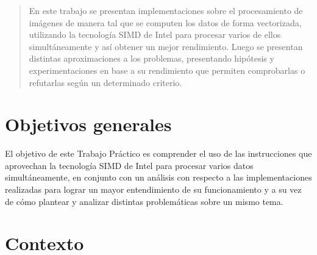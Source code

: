 \documentclass[a4paper]{article}
\begin{document}
\thispagestyle{empty}

\maketitle
\newpage

\thispagestyle{empty}
\vfill
\begin{abstract}
En este trabajo se presentan implementaciones sobre el procesamiento de imágenes de manera tal que se computen los datos de forma vectorizada, utilizando la tecnología SIMD de Intel para procesar varios de ellos simultáneamente y así obtener un mejor rendimiento. Luego se presentan distintas aproximaciones a los problemas, presentando hipótesis y experimentaciones en base a su rendimiento que permiten comprobarlas o refutarlas según un determinado criterio.
\end{abstract}

\thispagestyle{empty}
\vspace{3cm}
\tableofcontents
\newpage


\newpage

\section{Objetivos generales}

El objetivo de este Trabajo Práctico es comprender el uso de las instrucciones que aprovechan la tecnología SIMD de Intel para procesar varios datos simultáneamente, en conjunto con un análisis con respecto a las implementaciones realizadas para lograr un mayor entendimiento de su funcionamiento y a su vez de cómo plantear y analizar distintas problemáticas sobre un mismo tema.


\section{Contexto}


\end{document}
